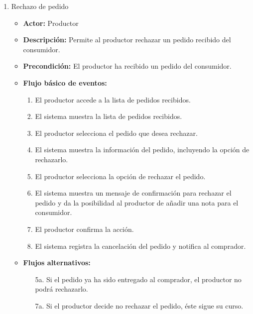 \begin{enumerate}[CU-1:]
\item{Rechazo de pedido}
\begin{itemize}
\item \textbf{Actor:} Productor
\item \textbf{Descripción:} Permite al productor rechazar un pedido recibido del consumidor.
\item \textbf{Precondición:} El productor ha recibido un pedido del consumidor.
\item \textbf{Flujo básico de eventos:}
\begin{enumerate}[1:]
\item El productor accede a la lista de pedidos recibidos.
\item El sistema muestra la lista de pedidos recibidos.
\item El productor selecciona el pedido que desea rechazar.
\item El sistema muestra la información del pedido, incluyendo la opción de rechazarlo.
\item El productor selecciona la opción de rechazar el pedido.
\item El sistema muestra un mensaje de confirmación para rechazar el pedido y da la posibilidad al productor de añadir una nota para el consumidor.
\item El productor confirma la acción.
\item El sistema registra la cancelación del pedido y notifica al comprador.
\end{enumerate}
\item \textbf{Flujos alternativos:}
\begin{itemize}
\item[5a.] Si el pedido ya ha sido entregado al comprador, el productor no podrá rechazarlo.
\item[7a.] Si el productor decide no rechazar el pedido, éste sigue su curso.
\end{itemize}
\end{itemize}
\end{enumerate}
